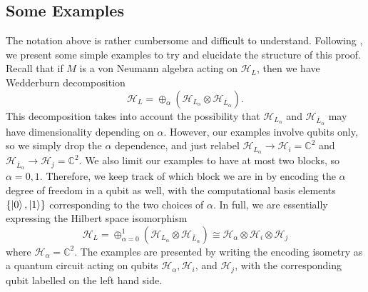 \documentclass[12pt,a4paper]{report}
\numberwithin{equation}{section}
\newcommand{\ol}[1]{\overline{#1}}
\theoremstyle{definition}
\theoremstyle{theorem}
\theoremstyle{theorem}
\theoremstyle{example}
\theoremstyle{definition}
\begin{document}
\subsection{Some Examples}
The notation above is rather cumbersome and difficult to understand. Following \cite{Pollack}, we present some simple examples to try and elucidate the structure of this proof. Recall that if $M$ is a von Neumann algebra acting on $\mathcal{H}_{L}$, then we have Wedderburn decomposition
\begin{equation}
	\mathcal{H}_{L}=\oplus_{\alpha}\left(\mathcal{H}_{L_{\alpha}}\otimes\mathcal{H}_{\ol{L}_{\alpha}}\right).
\end{equation}
This decomposition takes into account the possibility that $\mathcal{H}_{L_{\alpha}}$ and $\mathcal{H}_{\ol{L}_{\alpha}}$ may have dimensionality depending on $\alpha$. However, our examples involve qubits only, so we simply drop the $\alpha$ dependence, and just relabel $\mathcal{H}_{L_{\alpha}}\to\mathcal{H}_{i}=\mathbb{C}^{2}$ and $\mathcal{H}_{\ol{L}_{\alpha}}\to\mathcal{H}_{j}=\mathbb{C}^{2}$. We also limit our examples to have at most two blocks, so $\alpha=0,1$. Therefore, we keep track of which block we are in by encoding the $\alpha$ degree of freedom in a qubit as well, with the computational basis elements $\{\ket{0},\ket{1}\}$ corresponding to the two choices of $\alpha$. In full, we are essentially expressing the Hilbert space isomorphism
\begin{equation}
	\mathcal{H}_{L}=\oplus_{\alpha=0}^{1}\left(\mathcal{H}_{L_{\alpha}}\otimes\mathcal{H}_{\ol{L}_{\alpha}}\right)\cong \mathcal{H}_{\alpha}\otimes\mathcal{H}_{i}\otimes\mathcal{H}_{j}
\end{equation}
where $\mathcal{H}_{\alpha}=\mathbb{C}^{2}$. The examples are presented by writing the encoding isometry as a quantum circuit acting on qubits $\mathcal{H}_{\alpha},\mathcal{H}_{i}$, and $\mathcal{H}_{j}$, with the corresponding qubit labelled on the left hand side. 
\end{document}
